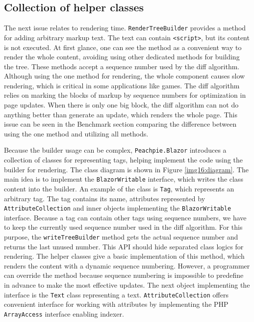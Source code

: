 \subsection{Collection of helper classes}

The next issue relates to rendering time.
\texttt{RenderTreeBuilder} provides a method for adding arbitrary markup text.
The text can contain \texttt{<script>}, but its content is not executed.
At first glance, one can see the method as a convenient way to render the whole content, avoiding using other dedicated methods for building the tree.
These methods accept a sequence number used by the diff algorithm. 
Although using the one method for rendering, the whole component causes slow rendering, which is critical in some applications like games.
The diff algorithm relies on marking the blocks of markup by sequence numbers for optimization in page updates.
When there is only one big block, the diff algorithm can not do anything better than generate an update, which renders the whole page. 
This issue can be seen in the Benchmark section comparing the difference between using the one method and utilizing all methods.
\par
Because the builder usage can be complex, \texttt{Peachpie.Blazor} introduces a collection of classes for representing tags, helping implement the code using the builder for rendering.
The class diagram is shown in Figure \ref{img16:diagram}.
The main idea is to implement the \texttt{BlazorWritable} interface, which writes the class content into the builder.
An example of the class is \texttt{Tag}, which represents an arbitrary tag.
The tag contains its name, attributes represented by \texttt{AttributeCollection} and inner objects implementing the \texttt{BlazorWritable} interface.
Because a tag can contain other tags using sequence numbers, we have to keep the currently used sequence number used in the diff algorithm.
For this purpose, the \texttt{writeTreeBuilder} method gets the actual sequence number and returns the last unused number.
This API should hide separated class logics for rendering.
The helper classes give a basic implementation of this method, which renders the content with a dynamic sequence numbering. 
However, a programmer can override the method because sequence numbering is impossible to predefine in advance to make the most effective updates.
The next object implementing the interface is the \texttt{Text} class representing a text.
\texttt{AttributeCollection} offers convenient interface for working with attributes by implementing the PHP \texttt{ArrayAccess} interface enabling indexer.
